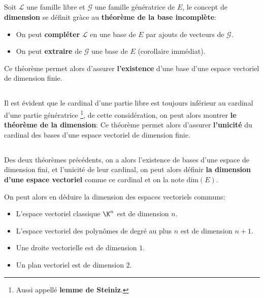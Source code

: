 \subsection*{}

Soit \(\mathcal{L}\) une famille libre et \(\mathcal{G}\) une famille génératrice de \(E\), le concept de \textbf{dimension} se définit gràce au \textbf{théorème de la base incomplète}:
\begin{itemize}
   \item On peut \textbf{compléter} \(\mathcal{L}\) en une base de \(E\) par ajouts de vecteurs de \(\mathcal{G}\).
   \item On peut \textbf{extraire} de \(\mathcal{G}\) une base de \(E\) (corollaire immédiat).
\end{itemize}
Ce théorème permet alors d'assurer \textbf{l'existence} d'une base d'une espace vectoriel de dimension finie.

\subsection*{}

Il est évident que le cardinal d'une partie libre est toujours inférieur au cardinal d'une partie génératrice \footnote[1]{Aussi appellé \textbf{lemme de Steiniz}.}, de cette considération, on peut alors montrer \textbf{le théorème de la dimension}:
Ce théorème permet alors d'assurer \textbf{l'unicité} du cardinal des bases d'une espace vectoriel de dimension finie.

\subsection*{}

Des deux théorèmes précédents, on a alors l'existence de bases d'une espace de dimension fini, et l'unicité de leur cardinal, on peut alors définir \textbf{la dimension d'une espace vectoriel} comme ce cardinal et on la note \(\text{dim}(E)\).\<

On peut alors en déduire la dimension des espaces vectoriels communs:
\begin{itemize}
   \item L'espace vectoriel classique \(\K^n\) est de dimension \(n\).
   \item L'espace vectoriel des polynômes de degré au plus \(n\) est de dimension \(n + 1\).
   \item Une droite vectorielle est de dimension \(1\).
   \item Un plan vectoriel est de dimension \(2\).
\end{itemize}

